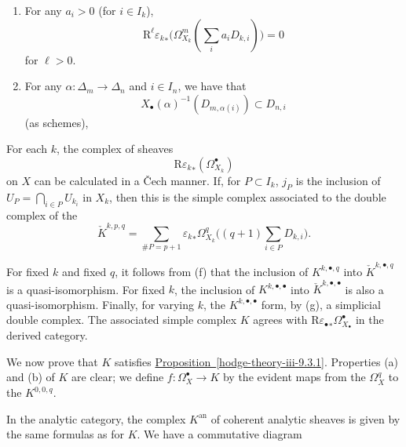     
 \begin{enumerate}
      
 \item[(f)]
        For any \(a_i>0\) (for \(i\in  I_k\)),
        \[           \mathrm {R}^\ell {\varepsilon _k}_*           \big ( \Omega _{X_k}^m(\textstyle \sum _i a_i D_{k,i}) \big )           = 0         \]
        for \(\ell >0\).
      


      
 \item[(g)]
        For any \(\alpha \colon \Delta _m\to \Delta _n\) and \(i\in  I_n\), we have that
        \[           X_\bullet (\alpha )^{-1}(D_{m,\alpha (i)})           \subset  D_{n,i}         \]
        (as schemes),
      

    \end{enumerate}\par{}For each \(k\), the complex of sheaves
    \[       \mathrm {R}{\varepsilon _k}_*(\Omega _{X_k}^\bullet )     \]
    on \(X\) can be calculated in a Čech manner.
    If, for \(P\subset  I_k\), \(j_P\) is the inclusion of \(U_P=\bigcap _{i\in  P}U_{k_i}\) in \(X_k\), then this is the simple complex associated to the double complex of the
    \[       \check {K}^{k,p,q}       = \sum _{\# P=p+1} {\varepsilon _k}_*\Omega _{X_k}^q\big ( (q+1)\textstyle \sum _{i\in  P} D_{k,i} \big ).     \]\par{}For fixed \(k\) and fixed \(q\), it follows from (f) that the inclusion of \(K^{k,\bullet ,q}\) into \(\check {K}^{k,\bullet ,q}\) is a quasi-isomorphism.
    For fixed \(k\), the inclusion of \(K^{k,\bullet ,\bullet }\) into \(\check {K}^{k,\bullet ,\bullet }\) is also a quasi-isomorphism.
    Finally, for varying \(k\), the \(K^{k,\bullet ,\bullet }\) form, by (g), a simplicial double complex.
    The associated simple complex \(K\) agrees with \(\mathrm {R}{\varepsilon _\bullet }_*\Omega _{X_\bullet }^\bullet \) in the derived category.\par{}We now prove that \(K\) satisfies \hyperref[hodge-theory-iii-9.3.1]{Proposition~\ref*{hodge-theory-iii-9.3.1}}.
    Properties (a) and (b) of \(K\) are clear;
    we define \(f\colon \Omega _X^\bullet \to  K\) by the evident maps from the \(\Omega _X^q\) to the \(K^{0,0,q}\).\par{}In the analytic category, the complex \(K^\mathrm {an}\) of coherent analytic sheaves is given by the same formulas as for \(K\).
    We have a commutative diagram
    

